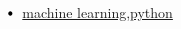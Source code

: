 \documentclass[letterpaper,11pt]{article}
\newcommand\sbullet[1][.5]{\mathbin{\vcenter{\hbox{\scalebox{#1}{$\bullet$}}}}}
\begin{document}
$\sbullet[.75] \hspace{0.1cm}$ {\href{https://www.udemy.com/certificate/UC-c0e8dc21-8e8b-4f6e-9d05-5d109a9523cd/}{machine learning,python}} \hspace{2.59cm}\\
\end{document}
